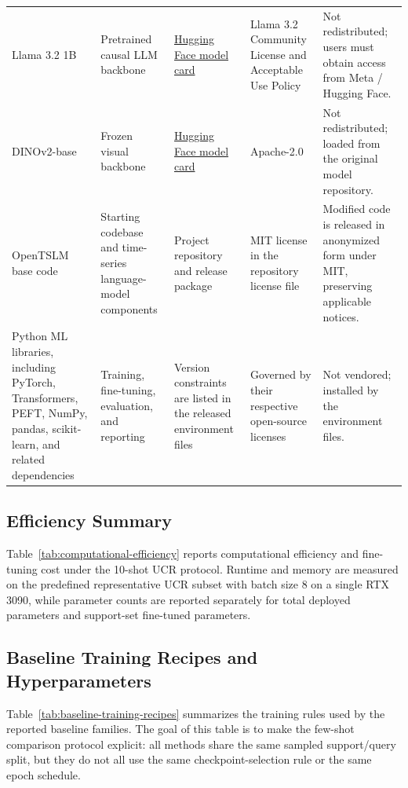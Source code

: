 \documentclass[10pt,journal,compsoc]{IEEEtran}
\begin{document}
\begin{longtable}{p{2.0cm}p{1.7cm}p{3.0cm}p{3.0cm}p{2.7cm}}
Llama 3.2 1B & Pretrained causal LLM backbone & \href{https://huggingface.co/meta-llama/Llama-3.2-1B}{Hugging Face model card} & Llama 3.2 Community License and Acceptable Use Policy & Not redistributed; users must obtain access from Meta / Hugging Face. \\
DINOv2-base & Frozen visual backbone & \href{https://huggingface.co/facebook/dinov2-base}{Hugging Face model card} & Apache-2.0 & Not redistributed; loaded from the original model repository. \\
OpenTSLM base code & Starting codebase and time-series language-model components & Project repository and release package & MIT license in the repository license file & Modified code is released in anonymized form under MIT, preserving applicable notices. \\
Python ML libraries, including PyTorch, Transformers, PEFT, NumPy, pandas, scikit-learn, and related dependencies & Training, fine-tuning, evaluation, and reporting & Version constraints are listed in the released environment files & Governed by their respective open-source licenses & Not vendored; installed by the environment files. \\
\end{longtable}
\endgroup

\subsection{Efficiency Summary}
\label{app:efficiency-summary}

Table~\ref{tab:computational-efficiency} reports computational efficiency and fine-tuning cost under the 10-shot UCR protocol. Runtime and memory are measured on the predefined representative UCR subset with batch size 8 on a single RTX 3090, while parameter counts are reported separately for total deployed parameters and support-set fine-tuned parameters.



\subsection{Baseline Training Recipes and Hyperparameters}
\label{app:baseline-details}

Table~\ref{tab:baseline-training-recipes} summarizes the training rules used by the reported baseline families.
The goal of this table is to make the few-shot comparison protocol explicit: all methods share the same sampled support/query split, but they do not all use the same checkpoint-selection rule or the same epoch schedule.
\end{document}

